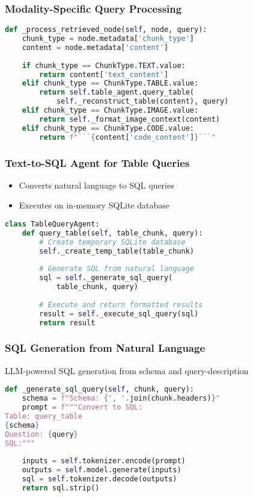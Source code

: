 \begin{frame}[fragile]\frametitle{Modality-Specific Query Processing}
\begin{lstlisting}[language=Python, basicstyle=\tiny]
def _process_retrieved_node(self, node, query):
    chunk_type = node.metadata['chunk_type']
    content = node.metadata['content']
    
    if chunk_type == ChunkType.TEXT.value:
        return content['text_content']
    elif chunk_type == ChunkType.TABLE.value:
        return self.table_agent.query_table(
            self._reconstruct_table(content), query)
    elif chunk_type == ChunkType.IMAGE.value:
        return self._format_image_context(content)
    elif chunk_type == ChunkType.CODE.value:
        return f"```{content['code_content']}```"
\end{lstlisting}
\end{frame}

\begin{frame}[fragile]\frametitle{Text-to-SQL Agent for Table Queries}

\begin{itemize}
\item Converts natural language to SQL queries
\item Executes on in-memory SQLite database
\end{itemize}

\begin{lstlisting}[language=Python, basicstyle=\tiny]
class TableQueryAgent:
    def query_table(self, table_chunk, query):
        # Create temporary SQLite database
        self._create_temp_table(table_chunk)
        
        # Generate SQL from natural language
        sql = self._generate_sql_query(
            table_chunk, query)
        
        # Execute and return formatted results
        result = self._execute_sql_query(sql)
        return result
\end{lstlisting}

\end{frame}

\begin{frame}[fragile]\frametitle{SQL Generation from Natural Language}

LLM-powered SQL generation from schema and query-description

\begin{lstlisting}[language=Python, basicstyle=\tiny]
def _generate_sql_query(self, chunk, query):
    schema = f"Schema: {', '.join(chunk.headers)}"
    prompt = f"""Convert to SQL:
Table: query_table
{schema}
Question: {query}
SQL:"""
    
    inputs = self.tokenizer.encode(prompt)
    outputs = self.model.generate(inputs)
    sql = self.tokenizer.decode(outputs)
    return sql.strip()
\end{lstlisting}
\end{frame}


